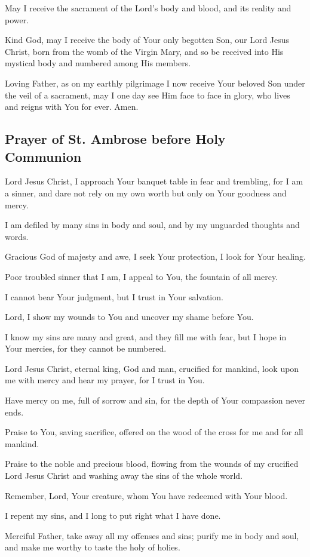 \documentclass[12pt]{article}
\newcommand{\prayertitle}[1]{\subsection{#1}}
\begin{document}
May I receive the sacrament of the Lord's body and blood, and its reality and power.

Kind God, may I receive the body of Your only begotten Son, our Lord Jesus Christ, born from the womb of the Virgin Mary, and so be received into His mystical body and numbered among His members.

Loving Father, as on my earthly pilgrimage I now receive Your beloved Son under the veil of a sacrament, may I one day see Him face to face in glory, who lives and reigns with You for ever.
Amen.

\prayertitle{Prayer of St. Ambrose before Holy Communion}
Lord Jesus Christ, I approach Your banquet table in fear and trembling, for I am a sinner, and dare not rely on my own worth but only on Your goodness and mercy.

I am defiled by many sins in body and soul, and by my unguarded thoughts and words.

Gracious God of majesty and awe, I seek Your protection, I look for Your healing.

Poor troubled sinner that I am, I appeal to You, the fountain of all mercy.

I cannot bear Your judgment, but I trust in Your salvation.

Lord, I show my wounds to You and uncover my shame before You.

I know my sins are many and great, and they fill me with fear, but I hope in Your mercies, for they cannot be numbered.

Lord Jesus Christ, eternal king, God and man, crucified for mankind, look upon me with mercy and hear my prayer, for I trust in You.

Have mercy on me, full of sorrow and sin, for the depth of Your compassion never ends.

Praise to You, saving sacrifice, offered on the wood of the cross for me and for all mankind.

Praise to the noble and precious blood, flowing from the wounds of my crucified Lord Jesus Christ and washing away the sins of the whole world.

Remember, Lord, Your creature, whom You have redeemed with Your blood.

I repent my sins, and I long to put right what I have done.

Merciful Father, take away all my offenses and sins;
purify me in body and soul, and make me worthy to taste the holy of holies.
\end{document}
